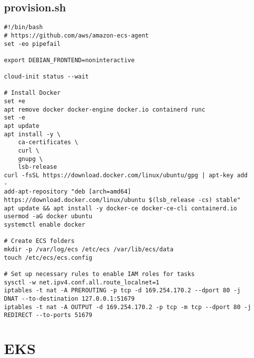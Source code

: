 \subsection*{provision.sh}
\begin{verbatim}
#!/bin/bash
# https://github.com/aws/amazon-ecs-agent
set -eo pipefail

export DEBIAN_FRONTEND=noninteractive 

cloud-init status --wait

# Install Docker
set +e
apt remove docker docker-engine docker.io containerd runc
set -e
apt update
apt install -y \
    ca-certificates \
    curl \
    gnupg \
    lsb-release
curl -fsSL https://download.docker.com/linux/ubuntu/gpg | apt-key add -
add-apt-repository "deb [arch=amd64] https://download.docker.com/linux/ubuntu $(lsb_release -cs) stable"
apt update && apt install -y docker-ce docker-ce-cli containerd.io
usermod -aG docker ubuntu
systemctl enable docker

# Create ECS folders 
mkdir -p /var/log/ecs /etc/ecs /var/lib/ecs/data
touch /etc/ecs/ecs.config

# Set up necessary rules to enable IAM roles for tasks
sysctl -w net.ipv4.conf.all.route_localnet=1
iptables -t nat -A PREROUTING -p tcp -d 169.254.170.2 --dport 80 -j DNAT --to-destination 127.0.0.1:51679
iptables -t nat -A OUTPUT -d 169.254.170.2 -p tcp -m tcp --dport 80 -j REDIRECT --to-ports 51679
\end{verbatim}

\section{EKS}
